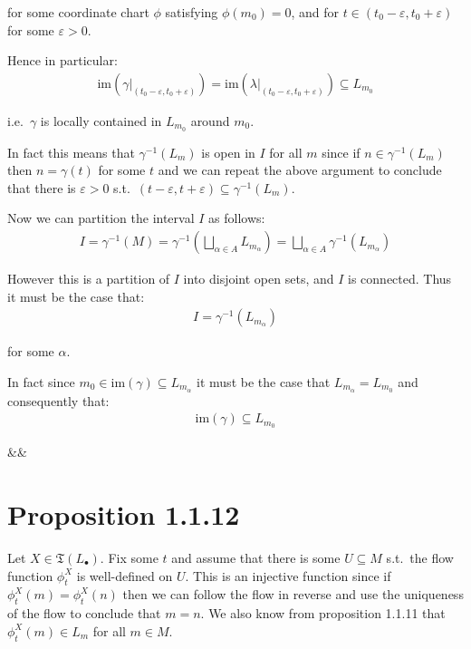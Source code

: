 		for some coordinate chart $\phi$ satisfying $\phi(m_0) = 0$, and for $t \in (t_0 - \varepsilon, t_0 + \varepsilon)$ for some $\varepsilon > 0$. \bigskip

		Hence in particular:
		\begin{align*}
			\text{im}(\gamma|_{(t_0 - \varepsilon, t_0 + \varepsilon)}) = \text{im}(\lambda|_{(t_0 - \varepsilon, t_0 + \varepsilon)}) \subseteq L_{m_0}
		\end{align*}

		i.e.\ $\gamma$ is locally contained in $L_{m_0}$ around $m_0$. \bigskip

		In fact this means that $\gamma^{-1}(L_{m})$ is open in $I$ for all $m$ since if $n \in \gamma^{-1}(L_{m})$ then $n = \gamma(t)$ for some $t$ and we can repeat the above argument to conclude that there is $\varepsilon > 0$ s.t.\ $(t - \varepsilon, t + \varepsilon) \subseteq \gamma^{-1}(L_m)$. \bigskip

		Now we can partition the interval $I$ as follows:
		\begin{align*}
			I = \gamma^{-1}(M) = \gamma^{-1}\left(\bigsqcup_{\alpha \in A} L_{m_\alpha}\right) = \bigsqcup_{\alpha \in A} \gamma^{-1}(L_{m_\alpha})
		\end{align*}

		However this is a partition of $I$ into disjoint open sets, and $I$ is connected. Thus it must be the case that:
		\begin{align*}
			I = \gamma^{-1}(L_{m_\alpha})
		\end{align*}

		for some $\alpha$. \bigskip

		In fact since $m_0 \in \text{im}(\gamma) \subseteq L_{m_\alpha}$ it must be the case that $L_{m_\alpha} = L_{m_0}$ and consequently that:
		\begin{align*}
			\text{im}(\gamma) \subseteq L_{m_0}
		\end{align*}

		\begin{flalign*}&&\square\end{flalign*}

	\section{Proposition 1.1.12}
		Let $X \in \mathfrak{T}(L_\bullet)$. Fix some $t$ and assume that there is some $U \subseteq M$ s.t.\ the flow function $\phi_t^X$ is well-defined on $U$. This is an injective function since if $\phi_t^X(m) = \phi_t^X(n)$ then we can follow the flow in reverse and use the uniqueness of the flow to conclude that $m = n$. We also know from proposition 1.1.11 that $\phi_t^X(m) \in L_m$ for all $m \in M$. \bigskip

